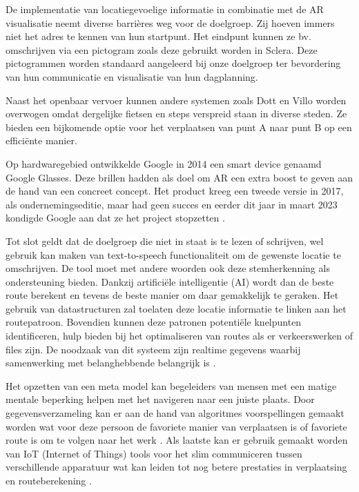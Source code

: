 \documentclass{hogent-article}
\begin{document}
    De implementatie van locatiegevoelige informatie in combinatie met de AR visualisatie neemt diverse barrières weg voor de doelgroep. Zij hoeven immers niet het adres te kennen van hun startpunt. Het eindpunt kunnen ze bv. omschrijven via een pictogram zoals deze gebruikt worden in Sclera. Deze pictogrammen worden standaard aangeleerd bij onze doelgroep ter bevordering van hun communicatie en visualisatie van hun dagplanning.
    
    Naast het openbaar vervoer kunnen andere systemen zoals Dott en Villo worden overwogen omdat dergelijke fietsen en steps verspreid staan in diverse steden. Ze bieden een bijkomende optie voor het verplaatsen van punt A naar punt B op een efficiënte manier.
    
    Op hardwaregebied ontwikkelde Google in 2014 een smart device genaamd Google Glasses. Deze brillen hadden als doel om AR een extra boost te geven aan de hand van een concreet concept. Het product kreeg een tweede versie in 2017, als ondernemingseditie, maar had geen succes en eerder dit jaar in maart 2023 kondigde Google aan dat ze het project stopzetten \autocite{Gvora2023}.
   
    Tot slot geldt dat de doelgroep die niet in staat is te lezen of schrijven, wel gebruik kan maken van text-to-speech functionaliteit om de gewenste locatie te omschrijven. De tool moet met andere woorden ook deze stemherkenning als ondersteuning bieden. Dankzij artificiële intelligentie (AI) wordt dan de beste route berekent en tevens de beste manier om daar gemakkelijk te geraken\autocite{Soni2023a}. Het gebruik van datastructuren zal toelaten deze locatie informatie te linken aan het routepatroon\autocite{Ruta2010}. Bovendien kunnen deze patronen potentiële knelpunten identificeren, hulp bieden bij het optimaliseren van routes als er verkeerswerken of files zijn. De noodzaak van dit systeem zijn realtime gegevens waarbij samenwerking met belanghebbende belangrijk is \autocite{Ciravegna2018}. 
    
    Het opzetten van een meta model kan begeleiders van mensen met een matige mentale beperking helpen met het navigeren naar een juiste plaats. Door gegevensverzameling kan er aan de hand van algoritmes voorspellingen gemaakt worden wat voor deze persoon de favoriete manier van verplaatsen is of favoriete route is om te volgen naar het werk \autocite{Stepanov2003}. Als laatste kan er gebruik gemaakt worden van IoT (Internet of Things) tools voor het slim communiceren tussen verschillende apparatuur wat kan leiden tot nog betere prestaties in verplaatsing en routeberekening \autocite{Fatnassi2015}.
    
\end{document}
